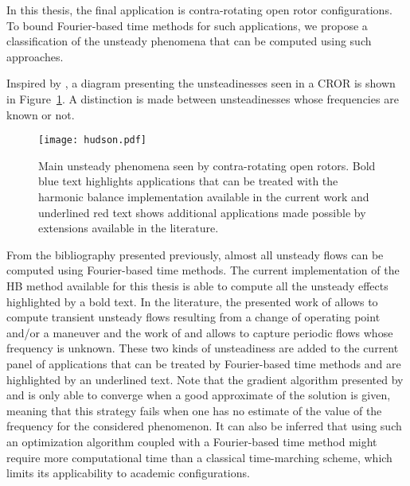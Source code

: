 
In this thesis, the final application is contra-rotating open rotor
configurations. To bound Fourier-based time methods for such
applications, we propose a classification of the
unsteady phenomena that can be computed using such approaches.

Inspired by \citet{Hodson1998},
a diagram presenting the unsteadinesses seen in 
a CROR is shown in Figure~\ref{fig:hudson}. A distinction
is made between unsteadinesses whose frequencies are
known or not.
\begin{figure}[htp]
  \centering
  \texttt{[image: hudson.pdf]}
  \caption{Main unsteady phenomena seen by contra-rotating
  open rotors. Bold blue text highlights applications that can
  be treated with the harmonic balance implementation available in the
  current work and underlined red text shows additional applications
  made possible by extensions available in the literature.}
  \label{fig:hudson}
\end{figure}
From the bibliography presented previously, almost all
unsteady flows can be computed using Fourier-based time methods.
The current implementation of the HB method available for
this thesis is able to compute all the unsteady effects highlighted
by a bold text. In the literature, the presented work of 
\citet{Mavriplis2012} allows to compute transient unsteady flows
resulting from a change of operating point and/or a maneuver and
the work of \citet{McMullen2002} and \citet{Gopinath2006} allows
to capture periodic flows whose frequency is unknown. These two
kinds of unsteadiness are added
to the current panel of applications that can
be treated by Fourier-based time methods and are
highlighted by an underlined text. Note
that the gradient algorithm presented by \citet{McMullen2002}
and \citet{Gopinath2006} is only able to converge when a 
good approximate of the solution is given, meaning
that this strategy fails when one has no estimate
of the value of the frequency for the considered phenomenon.
It can also be inferred that using such an optimization algorithm
coupled with a Fourier-based time method
might require more computational time than a classical time-marching scheme,
which limits its applicability to academic configurations.

